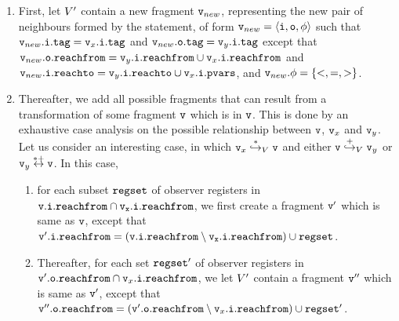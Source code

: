\begin{enumerate}
  \item
    First, let $\fragsetpost$ contain a new fragment $\frag_{new}$, representing
    the new pair of neighbours formed by the statement, of form
    $\frag_{new} = \fragtupleat{\frag_{new}}$ such that
    $\tagat{\inof{\frag_{new}}} = \tagat{\inof{\frag_x}}$ and
    $\tagat{\outof{\frag_{new}}} = \tagat{\inof{\frag_y}}$ except that
    $\reachfromat{\outof{\frag_{new}}} = \reachfromat{\inof{\frag_y}} \cup \reachfromat{\inof{\frag_x}}$ and
    $\reachtoat{\inof{\frag_{new}}} = \reachtoat{\inof{\frag_y}} \cup \pvarsat{\inof{\frag_x}}$, and
    $\datarelof{\frag_{new}} = \set{<,=,>}$.
  \item
    Thereafter, we add all possible fragments that can result from a transformation
of some fragment $\frag$ which is in $\frag$. This is done by an exhaustive
case analysis on the possible
relationship between $\frag$, $\frag_x$ and $\frag_y$.
Let us consider an interesting case, in which
$\frag_x \overset{*}\hookrightarrow_{\fragset} \frag$ and either $\frag \overset{+}\hookrightarrow_{\fragset} \frag_y$ or $\frag_y \overset{*+}\leftrightarrow \frag$.
In this case,
\begin{enumerate}
\item
  for each subset $\regset$ of observer registers in $\tt \reachfromat{\inof{\frag}} \cap \reachfromat{\inof{\frag_x}}$, we first create
  a fragment $\frag'$ which is same as $\frag$, except that $\reachfromat{\inof{\frag'}} = (\tt \reachfromat{\inof{\frag}} \setminus \reachfromat{\inof{\frag_x}}) \cup \regset$.
\item
  Thereafter, 
for each set $\regset'$ of observer registers in $\reachfromat{\outof{\frag'}} \cap \reachfromat{\inof{\frag_x}}$,  we let $\fragsetpost$ contain a fragment
$\frag''$ which is same as $\frag'$, except that $\reachfromat{\outof{\frag''}} = (\reachfromat{\outof{\frag'}} \setminus \reachfromat{\inof{\frag_x}}) \cup \regset'$. 
\end{enumerate}
\end{enumerate}

